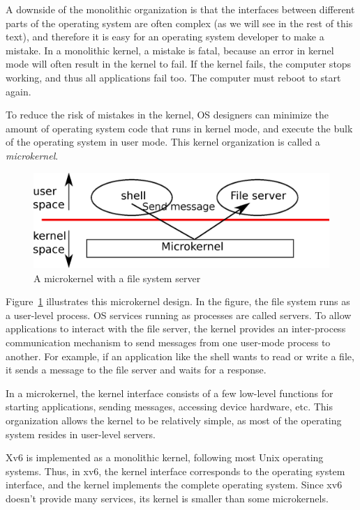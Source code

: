 A downside of the monolithic organization is that the interfaces between
different parts of the operating system are often complex (as we will see in the
rest of this text), and therefore it is easy for an operating system developer
to make a mistake.  In a monolithic kernel, a mistake is fatal, because an error
in kernel mode will often result in the kernel to fail.  If the kernel fails,
the computer stops working, and thus all applications fail too.  The computer
must reboot to start again.

To reduce the risk of mistakes in the kernel, OS designers can minimize the
amount of operating system code that runs in kernel mode, and execute the
bulk of the operating system in user mode.
This kernel organization is called a
\textit{microkernel}.

\begin{figure}[t]
\center
\includegraphics[scale=0.5]{fig/mkernel.eps}
\caption{A microkernel with a file system server}
\label{fig:mkernel}
\end{figure}

Figure~\ref{fig:mkernel}
illustrates this microkernel design.  In the figure, the file system runs as a
user-level process.  OS services running as processes are called servers.
To allow applications to interact with the
file server, the kernel provides an inter-process communication
mechanism to send messages from one
user-mode process to another.  For example, if an application like the shell
wants to read or write a file, it sends a message to the file server and waits
for a response. 

In a microkernel, the kernel interface consists of a few low-level
functions for starting applications, sending messages,
accessing device hardware, etc.  This organization allows the kernel to be 
relatively simple, as most of the operating system
resides in user-level servers.

Xv6 is
implemented as a monolithic kernel, following most Unix operating systems.
Thus, in xv6, the kernel interface corresponds to the operating system
interface, and the kernel implements the complete operating system.  Since 
xv6 doesn't provide many services, its kernel is smaller than some
microkernels.
